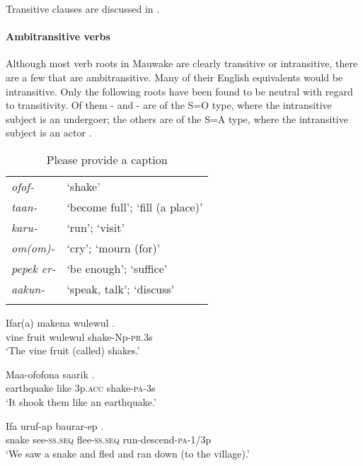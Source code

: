 Transitive clauses are discussed in .

\paragraph{Ambitransitive verbs}\label{sec:3.8.4.2.3}
{}
Although most verb roots in Mauwake are clearly transitive or intransitive, there are a few that are ambitransitive. Many of their English equivalents would be intransitive. Only the following roots have been found to be neutral with regard to transitivity. Of them - and - are of the S=O type, where the intransitive subject is an undergoer; the others are of the S=A type, where the intransitive subject is an actor \citep[124]{Dixon2010b}.

\begin{table}
\caption{Please provide a caption}
\label{} 
\begin{tabular}{>{\itshape}ll}
\mytoprule
ofof- &`shake'\\
taan- &`become full'; `fill (a place)'\\
karu- &`run'; `visit'\\
om(om)- &`cry'; `mourn (for)'\\
pepek er- &`be enough'; `suffice'\\
aakun- &`speak, talk'; `discuss'\\
\mybottomrule
\end{tabular}

\end{table}

\ea%
\label{ex:3:x1827}
\gll Ifar(a) makena wulewul . \\
vine fruit wulewul shake-Np-\textsc{pr}.3s\\
\glt`The vine fruit (called)  shakes.'
\z

\ea%
\label{ex:3:x1826}
\gll Maa-ofofona saarik  . \\
earthquake like 3p.\textsc{acc} shake-\textsc{pa}-3s\\
\glt`It shook them like an earthquake.'
\z

\ea%
\label{ex:3:x304}
\gll Ifa uruf-ap baurar-ep . \\
snake see-\textsc{ss}.\textsc{seq} flee-\textsc{ss}.\textsc{seq} run-descend-\textsc{pa}-1/3p \\
\glt`We saw a snake and fled and ran down (to the village).'
\z

